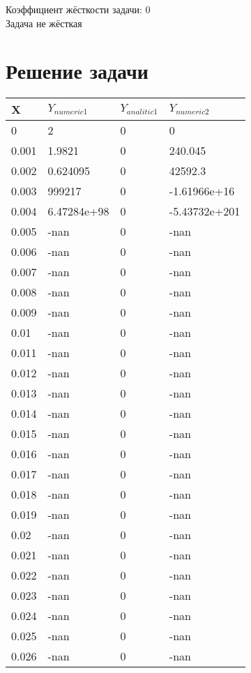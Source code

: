 \documentclass[a4paper,14pt]{extarticle}
\begin{document}
Коэффициент жёсткости задачи: 0\\
Задача не жёсткая

\section{Решение задачи}

\begin{longtable}{||m{3cm}||m{3cm}|m{3cm}||m{3cm}||}
\hline
\cellcolor{lightgray} X & \cellcolor{lightgray} $Y_{numeric1}$ & \cellcolor{lightgray} $Y_{analitic1}$ & \cellcolor{lightgray} $Y_{numeric2}$\\
\hline
0 & 2 & 0 & 0\\
\hline
0.001 & 1.9821 & 0 & 240.045\\
\hline
0.002 & 0.624095 & 0 & 42592.3\\
\hline
0.003 & 999217 & 0 & -1.61966e+16\\
\hline
0.004 & 6.47284e+98 & 0 & -5.43732e+201\\
\hline
0.005 & -nan & 0 & -nan\\
\hline
0.006 & -nan & 0 & -nan\\
\hline
0.007 & -nan & 0 & -nan\\
\hline
0.008 & -nan & 0 & -nan\\
\hline
0.009 & -nan & 0 & -nan\\
\hline
0.01 & -nan & 0 & -nan\\
\hline
0.011 & -nan & 0 & -nan\\
\hline
0.012 & -nan & 0 & -nan\\
\hline
0.013 & -nan & 0 & -nan\\
\hline
0.014 & -nan & 0 & -nan\\
\hline
0.015 & -nan & 0 & -nan\\
\hline
0.016 & -nan & 0 & -nan\\
\hline
0.017 & -nan & 0 & -nan\\
\hline
0.018 & -nan & 0 & -nan\\
\hline
0.019 & -nan & 0 & -nan\\
\hline
0.02 & -nan & 0 & -nan\\
\hline
0.021 & -nan & 0 & -nan\\
\hline
0.022 & -nan & 0 & -nan\\
\hline
0.023 & -nan & 0 & -nan\\
\hline
0.024 & -nan & 0 & -nan\\
\hline
0.025 & -nan & 0 & -nan\\
\hline
0.026 & -nan & 0 & -nan\\

\end{longtable}
\end{document}
